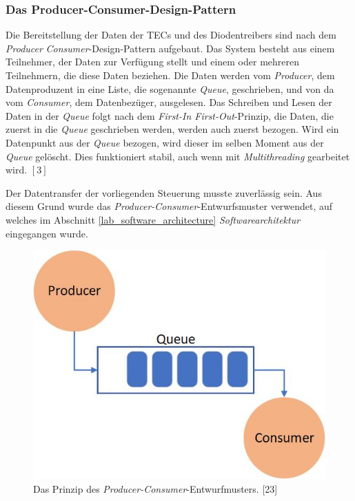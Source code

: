 \subsubsection{Das Producer-Consumer-Design-Pattern}
\label{section:_producer_consumer}
Die Bereitstellung der Daten der TECs und des Diodentreibers sind nach dem \textit{Producer} \textit{Consumer}-Design-Pattern aufgebaut. Das System besteht aus einem Teilnehmer, der Daten zur Verfügung stellt und einem oder mehreren Teilnehmern, die diese Daten beziehen. Die Daten werden vom \textit{Producer}, dem Datenproduzent in eine Liste, die sogenannte \textit{Queue}, geschrieben, und von da vom \textit{Consumer}, dem Datenbezüger, ausgelesen. Das Schreiben und Lesen der Daten in der \textit{Queue} folgt nach dem \textit{First-In First-Out}-Prinzip, die Daten, die zuerst in die \textit{Queue} geschrieben werden, werden auch zuerst bezogen. Wird ein Datenpunkt aus der \textit{Queue} bezogen, wird dieser im selben Moment aus der \textit{Queue} gelöscht. Dies funktioniert stabil, auch wenn mit \textit{Multithreading} gearbeitet wird. $[3]$

Der Datentransfer der vorliegenden Steuerung musste zuverlässig sein. Aus diesem Grund wurde das \textit{Producer-Consumer}-Entwurfsmuster verwendet, auf welches im Abschnitt \ref{lab_software_architecture}  \textit{Softwarearchitektur} eingegangen wurde.

\begin{figure}[H]
    \centering
    \includegraphics[scale=0.5]{98_images/producer_consumer_design_pattern.jpg}
    \caption{Das Prinzip des \textit{Producer-Consumer}-Entwurfmusters. [23]}
    \label{fig:_producer_consumer}
 \end{figure}

